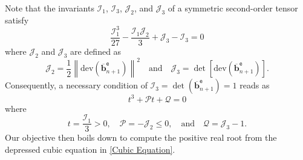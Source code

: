 \documentclass[preprint,11pt]{elsarticle}
\theoremstyle{definition}
\begin{document}
Note that the invariants $\mathcal{I}_1$, $\mathcal{I}_3$, $\mathcal{J}_2$, and $\mathcal{J}_3$ of a symmetric second-order tensor satisfy
\begin{equation*}
    \dfrac{\mathcal{I}_1^3}{27} - \dfrac{\mathcal{I}_1 \mathcal{J}_2}{3} + \mathcal{J}_3 - \mathcal{I}_3 = 0
\end{equation*}
where $\mathcal{J}_2$ and $\mathcal{J}_3$ are defined as
\begin{equation*}
    \mathcal{J}_2 = \dfrac{1}{2} \left\lVert \text{dev} \left( \overline{\mathbf{b}}_{n+1}^\texttt{e} \right) \right\rVert^2
    \quad \text{and} \quad
    \mathcal{J}_3 = \det \left[ \text{dev} \left( \overline{\mathbf{b}}_{n+1}^\texttt{e} \right) \right].
\end{equation*}
Consequently, a necessary condition of $\mathcal{I}_3 = \det(\overline{\mathbf{b}}_{n+1}^\texttt{e}) = 1$ reads as
\begin{equation} \label{Cubic Equation}
    t^3 + \mathcal{P} t + \mathcal{Q} = 0
\end{equation}
where
\begin{equation*}
    t = \dfrac{\mathcal{I}_1}{3} > 0, \quad
    \mathcal{P} = - \mathcal{J}_2 \leq 0, \quad \text{and} \quad
    \mathcal{Q} = \mathcal{J}_3 - 1.
\end{equation*}
Our objective then boils down to compute the positive real root from the depressed cubic equation in \eqref{Cubic Equation}.
\end{document}

